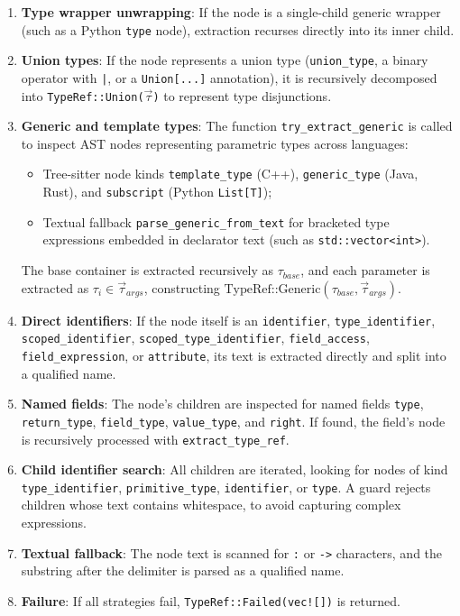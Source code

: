 \begin{enumerate}
  \item \textbf{Type wrapper unwrapping}: If the node is a single-child
    generic wrapper (such as a Python \texttt{type} node), extraction
    recurses directly into its inner child.
  \item \textbf{Union types}: If the node represents a union type
    (\texttt{union\_type}, a binary operator with \texttt{|}, or a
    \texttt{Union[...]} annotation), it is recursively decomposed
    into \texttt{TypeRef::Union($\vec{\tau}$)} to represent type disjunctions.
  \item \textbf{Generic and template types}: The function
    \texttt{try\_extract\_generic} is called to inspect AST nodes representing
    parametric types across languages:
    \begin{itemize}
      \item Tree-sitter node kinds \texttt{template\_type} (C++),
        \texttt{generic\_type} (Java, Rust), and \texttt{subscript}
        (Python \texttt{List[T]});
      \item Textual fallback \texttt{parse\_generic\_from\_text} for bracketed
        type expressions embedded in declarator text (such as
        \texttt{std::vector<int>}).
    \end{itemize}
    The base container is extracted recursively as $\tau_{base}$, and each
    parameter is extracted as $\tau_i \in \vec{\tau}_{args}$, constructing
    $\text{TypeRef::Generic}(\tau_{base}, \vec{\tau}_{args})$.
  \item \textbf{Direct identifiers}: If the node itself is an
    \texttt{identifier}, \texttt{type\_identi}\-\texttt{fier},
    \texttt{scoped\_identifier}, \texttt{scoped\_type\_identifier},
    \texttt{field\_access}, \\ \texttt{field\_expression}, or
    \texttt{attribute}, its text is extracted directly and split into
    a qualified name.
  \item \textbf{Named fields}: The node's children are inspected for
    named fields \texttt{type}, \texttt{return\_type},
    \texttt{field\_type}, \texttt{value\_type}, and \texttt{right}.
    If found, the field's node is recursively processed with
    \texttt{extract\_type\_ref}.
  \item \textbf{Child identifier search}: All children are iterated,
    looking for nodes of kind \texttt{type\_identifier},
    \texttt{primitive\_type}, \texttt{identifier}, or \texttt{type}.
    A guard rejects children whose text contains whitespace, to avoid
    capturing complex expressions.
  \item \textbf{Textual fallback}: The node text is scanned for
    \texttt{:} or \texttt{->} characters, and the substring after the
    delimiter is parsed as a qualified name.
  \item \textbf{Failure}: If all strategies fail,
    \texttt{TypeRef::Failed(vec![])} is returned.
\end{enumerate}

